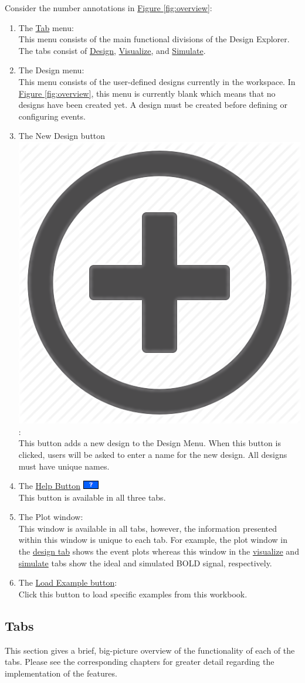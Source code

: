\documentclass[10pt]{article}
\newcommand*{\hbut}{\includegraphics[scale=0.45]{fig/0_help.jpg}}
\newcommand*{\nbut}{\includegraphics[scale=0.02]{fig/0_new.png}}
\begin{document}
		Consider the number annotations in \hyperref[fig:overview]{Figure \ref{fig:overview}}:
		\begin{enumerate}
			\item The \hyperref[subsec:tabs]{Tab} menu: \\
			This menu consists of the main functional divisions of the Design Explorer.
			The tabs consist of \hyperref[subsubsec:design]{Design}, \hyperref[subsubsec:visualize]{Visualize}, and \hyperref[subsubsec:simulate]{Simulate}.
			\item The Design menu: \\
			This menu consists of the user-defined designs currently in the workspace.
			In \hyperref[fig:overview]{Figure \ref{fig:overview}}, this menu is currently blank which means that no designs have been created yet.
			A design must be created before defining or configuring events.
			\item The New Design button \nbut{}: \\
			This button adds a new design to the Design Menu.
			When this button is clicked, users will be asked to enter a name for the new design.
			All designs must have unique names.
			\item The \hyperref[subsubsec:hbut]{Help Button} \hbut{} \\
			This button is available in all three tabs.
			\item The Plot window: \\
			This window is available in all tabs, however, the information presented within this window is unique to each tab.
			For example, the plot window in the \hyperref[subsubsec:design]{design tab} shows the event plots whereas this window in the \hyperref[subsubsec:visualize]{visualize} and \hyperref[subsubsec:simulate]{simulate} tabs show the ideal and simulated BOLD signal, respectively.
			\item The \hyperref[subsubsec:example]{Load Example button}: \\
			Click this button to load specific examples from this workbook.    
		\end{enumerate}

	\subsection{Tabs}
	\label{subsec:tabs}
		This section gives a brief, big-picture overview of the functionality of each of the tabs. Please see the corresponding chapters for greater detail regarding the implementation of the features.
\end{document}
